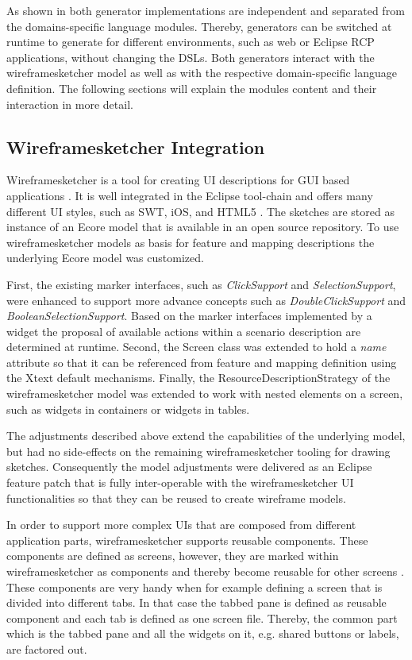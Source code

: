 \documentclass{sig-alternate-05-2015}
\begin{document}
As shown in  both generator implementations are independent and separated from the domains-specific language modules.
Thereby, generators can be switched at runtime to generate for different environments, such as web or Eclipse RCP applications, without changing the DSLs.
Both generators interact with the wireframesketcher model as well as with the respective domain-specific language definition.
The following sections will explain the modules content and their interaction in more detail.

\subsection{Wireframesketcher Integration}\label{sec:WireframesketcherIntegration} 
Wireframesketcher is a tool for creating UI descriptions for GUI based applications \cite{sanchezgui}. 
It is well integrated in the Eclipse tool-chain and offers many different UI styles, such as SWT, iOS, and HTML5  \cite{Wireframesketcher}.
The sketches are stored as instance of an Ecore model that is available in an open source repository.
To use wireframesketcher models as basis for feature and mapping descriptions the underlying Ecore model was customized.

First, the existing marker interfaces, such as \textit{ClickSupport} and \textit{SelectionSupport}, were enhanced to support more advance concepts such as \textit{DoubleClickSupport} and \textit{BooleanSelectionSupport}.
Based on the marker interfaces implemented by a widget the proposal of available actions within a scenario description are determined at runtime.
Second, the Screen class was extended to hold a \textit{name} attribute so that it can be referenced from feature and mapping definition using the Xtext default mechanisms.
Finally, the ResourceDescriptionStrategy \cite{xtext.resourcedesc} of the wireframesketcher model was extended to work with nested elements on a screen, such as widgets in containers or widgets in tables.

The adjustments described above extend the capabilities of the underlying model, but had no side-effects on the remaining wireframesketcher tooling for drawing sketches.
Consequently the model adjustments were delivered as an Eclipse feature patch that is fully inter-operable with the wireframesketcher UI functionalities so that they can be reused to create wireframe models.

In order to support more complex UIs that are composed from different application parts, wireframesketcher supports reusable components.
These components are defined as screens, however, they are marked within wireframesketcher as components and thereby become reusable for other screens \cite{Wireframesketcher.components}.
These components are very handy when for example defining a screen that is divided into different tabs.
In that case the tabbed pane is defined as reusable component and each tab is defined as one screen file.
Thereby, the common part which is the tabbed pane and all the widgets on it, e.g. shared buttons or labels, are factored out.
\end{document}
